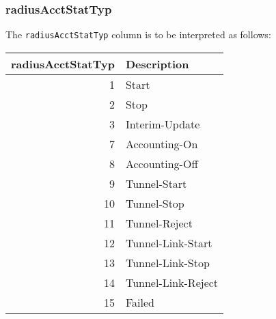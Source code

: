 \documentclass[documentation]{subfiles}
\begin{document}
\subsubsection{radiusAcctStatTyp}\label{radiusAcctStatTyp}
The {\tt radiusAcctStatTyp} column is to be interpreted as follows:
\begin{longtable}{rl}
    \toprule
    {\bf radiusAcctStatTyp} & {\bf Description}\\
    \midrule\endhead%
     1 & Start\\
     2 & Stop\\
     3 & Interim-Update\\
     7 & Accounting-On\\
     8 & Accounting-Off\\
     9 & Tunnel-Start\\
    10 & Tunnel-Stop\\
    11 & Tunnel-Reject\\
    12 & Tunnel-Link-Start\\
    13 & Tunnel-Link-Stop\\
    14 & Tunnel-Link-Reject\\
    15 & Failed\\
    \bottomrule
\end{longtable}
\end{document}
